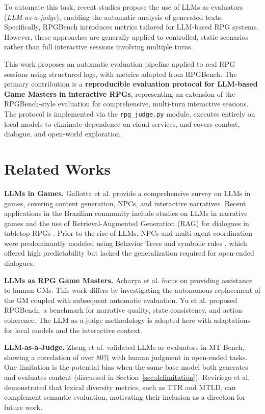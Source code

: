\documentclass[12pt]{article}
\begin{document}
To automate this task, recent studies propose the use of LLMs as evaluators (\textit{LLM-as-a-judge}), enabling the automatic analysis of generated texts. Specifically, RPGBench \cite{yu:2025} introduces metrics tailored for LLM-based RPG systems. However, these approaches are generally applied to controlled, static scenarios rather than full interactive sessions involving multiple turns.

This work proposes an automatic evaluation pipeline applied to real RPG sessions using structured logs, with metrics adapted from RPGBench. The primary contribution is a \textbf{reproducible evaluation protocol for LLM-based Game Masters in interactive RPGs}, representing an extension of the RPGBench-style evaluation for comprehensive, multi-turn interactive sessions. The protocol is implemented via the \texttt{rpg\_judge.py} module, executes entirely on local models to eliminate dependence on cloud services, and covers combat, dialogue, and open-world exploration.

\section{Related Works}

\textbf{LLMs in Games.}
Gallotta et al. \cite{gallotta:2024} provide a comprehensive survey on LLMs in games, covering content generation, NPCs, and interactive narratives. Recent applications in the Brazilian community include studies on LLMs in narrative games \cite{sbgames:llm:2025} and the use of Retrieval-Augmented Generation (RAG) for dialogues in tabletop RPGs \cite{sbgames:tabletop:2025}. Prior to the rise of LLMs, NPCs and multi-agent coordination were predominantly modeled using Behavior Trees and symbolic rules \cite{agis:2020}, which offered high predictability but lacked the generalization required for open-ended dialogues.

\textbf{LLMs as RPG Game Masters.}
Acharya et al. \cite{acharya:2023} focus on providing assistance to human GMs. This work differs by investigating the autonomous replacement of the GM coupled with subsequent automatic evaluation. Yu et al. \cite{yu:2025} proposed RPGBench, a benchmark for narrative quality, state consistency, and action coherence. The LLM-as-a-judge methodology is adopted here with adaptations for local models and the interactive context.

\textbf{LLM-as-a-Judge.}
Zheng et al. \cite{zheng:2023} validated LLMs as evaluators in MT-Bench, showing a correlation of over 80\% with human judgment in open-ended tasks. One limitation is the potential bias when the same base model both generates and evaluates content (discussed in Section~\ref{sec:delimitation}). Reviriego et al. \cite{reviriego:2024} demonstrated that lexical diversity metrics, such as TTR and MTLD, can complement semantic evaluation, motivating their inclusion as a direction for future work.
\end{document}
